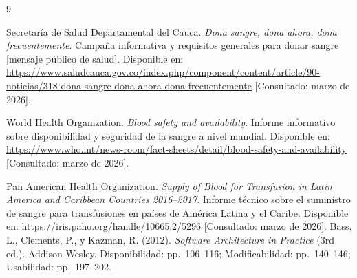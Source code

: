 \renewcommand{\refname}{Referencias}
{}

\begin{thebibliography}{9}

Secretaría de Salud Departamental del Cauca.
\textit{Dona sangre, dona ahora, dona frecuentemente}.
Campaña informativa y requisitos generales para donar sangre [mensaje público de salud].
Disponible en: \url{https://www.saludcauca.gov.co/index.php/component/content/article/90-noticias/318-dona-sangre-dona-ahora-dona-frecuentemente}
[Consultado: marzo de 2026].

World Health Organization.
\textit{Blood safety and availability}.
Informe informativo sobre disponibilidad y seguridad de la sangre a nivel mundial.
Disponible en: \url{https://www.who.int/news-room/fact-sheets/detail/blood-safety-and-availability}
[Consultado: marzo de 2026].

Pan American Health Organization.
\textit{Supply of Blood for Transfusion in Latin America and Caribbean Countries 2016–2017}.
Informe técnico sobre el suministro de sangre para transfusiones en países de América Latina y el Caribe.
Disponible en: \url{https://iris.paho.org/handle/10665.2/5296}
[Consultado: marzo de 2026].
Bass, L., Clements, P., y Kazman, R. (2012).
\textit{Software Architecture in Practice} (3rd ed.).
Addison-Wesley.
Disponibilidad: pp.~106--116; Modificabilidad: pp.~140--146; Usabilidad: pp.~197--202.
\end{thebibliography}
